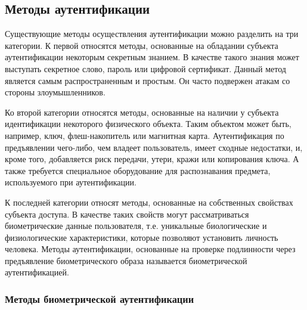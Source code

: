 \documentclass[12pt]{article}
\begin{document}
    \subsection{Методы аутентификации}
    \label{sec:Intro:ApplicationArea:AuthenticationMethods}

    \par Существующие методы осуществления аутентификации можно разделить на три категории. К первой относятся методы, основанные на обладании субъекта аутентификации некоторым секретным знанием. В качестве такого знания может выступать секретное слово, пароль или цифровой сертификат. Данный метод является самым распространенным и простым. Он часто подвержен атакам со стороны злоумышленников. \\
    \par Ко второй категории относятся методы, основанные на наличии у субъекта идентификации некоторого физического объекта. Таким объектом может быть, например, ключ, флеш-накопитель или магнитная карта. Аутентификация по предъявлении чего-либо, чем владеет пользователь, имеет сходные недостатки, и, кроме того, добавляется риск передачи, утери, кражи или копирования ключа. А также требуется специальное оборудование для распознавания предмета, используемого при аутентификации. \\
    \par К последней категории относят методы, основанные на собственных свойствах субъекта доступа. В качестве таких свойств могут рассматриваться биометрические данные пользователя, т.е. уникальные биологические и физиологические характеристики, которые позволяют установить личность человека. Методы аутентификации, основанные на проверке подлинности через предъявление биометрического образа называется биометрической аутентификацией. \\

    \subsubsection{Методы биометрической аутентификации}
    \label{sec:Intro:ApplicationArea:AuthenticationMethods:Biometric}
\end{document}
